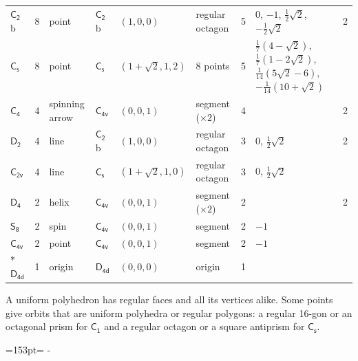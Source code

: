 \documentclass[10pt,a4paper]{article}
\newcommand{\needspace}[1]{\par\penalty-100\begingroup\dimen0=#1\relax\dimen2=\pagegoal
  \advance\dimen2-\pagetotal\ifdim\dimen0>\dimen2\relax\ifdim\dimen2>0pt\vfil\break\fi\fi
  \endgroup}
\numberwithin{equation}{section}
\newcommand{\grp}[1]{\mathsf{#1}}
\newcommand{\clsletter}[1]{\,{\scriptsize\color{black!55}#1}}
\newlength{\fillwidth}\newlength{\cellwidth}\newlength{\colwidth}
\begin{document}
{{\begin{longtable}{@{}lrllllr>{\RaggedRight\arraybackslash}p{\fillwidth}r@{}}
\href{C2.pdf}{$\grp{C_{2}}$}\clsletter{b} & 8 & point & \href{C2.pdf}{$\grp{C_{2}}$}\clsletter{b} & $(1, 0, 0)$ & regular octagon & 5 & ${0}$, ${-1}$, ${\tfrac{1}{2}\sqrt{2}}$, ${-\tfrac{1}{2}\sqrt{2}}$ & 2\\
\href{C1v.pdf}{$\grp{C_{s}}$} & 8 & point & \href{C1v.pdf}{$\grp{C_{s}}$} & $(1 + \sqrt{2}, 1, 2)$ & 8 points & 5 & ${\tfrac{1}{7}(4 - \sqrt{2})}$, ${\tfrac{1}{7}(1 - 2\sqrt{2})}$, ${\tfrac{1}{14}(5\sqrt{2} - 6)}$, ${-\tfrac{1}{14}(10 + \sqrt{2})}$ & \\
\href{C4.pdf}{$\grp{C_{4}}$} & 4 & spinning arrow & \href{C4v.pdf}{$\grp{C_{4v}}$} & $(0, 0, 1)$ & segment (${\times}2$) & 4 &  & 2\\
\href{D2.pdf}{$\grp{D_{2}}$} & 4 & line & \href{C2.pdf}{$\grp{C_{2}}$}\clsletter{b} & $(1, 0, 0)$ & regular octagon & 3 & ${0}$, ${\tfrac{1}{2}\sqrt{2}}$ & 2\\
\href{C2v.pdf}{$\grp{C_{2v}}$} & 4 & line & \href{C1v.pdf}{$\grp{C_{s}}$} & $(1 + \sqrt{2}, 1, 0)$ & regular octagon & 3 & ${0}$, ${\tfrac{1}{2}\sqrt{2}}$ & \\
\href{D4.pdf}{$\grp{D_{4}}$} & 2 & helix & \href{C4v.pdf}{$\grp{C_{4v}}$} & $(0, 0, 1)$ & segment (${\times}2$) & 2 &  & 2\\
\href{S8.pdf}{$\grp{S_{8}}$} & 2 & spin & \href{C4v.pdf}{$\grp{C_{4v}}$} & $(0, 0, 1)$ & segment & 2 & ${-1}$ & \\
\href{C4v.pdf}{$\grp{C_{4v}}$} & 2 & point & \href{C4v.pdf}{$\grp{C_{4v}}$} & $(0, 0, 1)$ & segment & 2 & ${-1}$ & \\*
\href{D4d.pdf}{$\grp{D_{4d}}$} & 1 & origin & \href{D4d.pdf}{$\grp{D_{4d}}$} & $(0, 0, 0)$ & origin & 1 &  & \\
\bottomrule\end{longtable}}}
A uniform polyhedron has regular faces and all its vertices alike. Some points give orbits that are uniform polyhedra or regular polygons: a regular 16-gon or an octagonal prism for \href{C1.pdf}{$\grp{C_{1}}$} and a regular octagon or a square antiprism for \href{C1v.pdf}{$\grp{C_{s}}$}.
\needspace{153pt}
\end{document}
